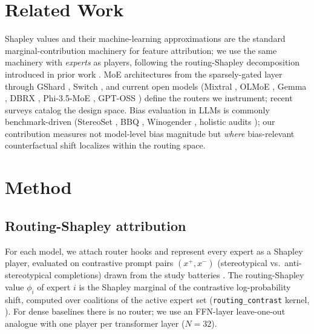 \documentclass[sigconf]{acmart}
\begin{document}

\section{Related Work}
\label{sec:related}
Shapley values \cite{shapley1953} and their machine-learning
approximations \cite{lundberg2017,rozemberczki2022} are the standard
marginal-contribution machinery for feature attribution; we use the same
machinery with \emph{experts} as players, following the routing-Shapley
decomposition introduced in prior work \cite{moe_research_2026}. MoE
architectures from the sparsely-gated layer \cite{shazeer2017} through
GShard \cite{lepikhin2021}, Switch \cite{fedus2022}, and current open
models (Mixtral \cite{jiang2024}, OLMoE \cite{muennighoff2024}, Gemma
\cite{gemmaTeam2024}, DBRX \cite{databricks2024dbrx}, Phi-3.5-MoE
\cite{abdin2024phi3}, GPT-OSS \cite{openai2025gptoss}) define the routers
we instrument; recent surveys \cite{cai2024} catalog the design space.
Bias evaluation in LLMs is commonly benchmark-driven (StereoSet
\cite{nadeem2021}, BBQ \cite{parrish2022}, Winogender
\cite{rudinger2018winogender}, holistic audits
\cite{liang2023,mehrabi2021}); our
contribution measures not model-level bias magnitude but \emph{where}
bias-relevant counterfactual shift localizes within the routing space.

\section{Method}
\subsection{Routing-Shapley attribution}
For each model, we attach router hooks and represent every expert as a
Shapley player, evaluated on contrastive prompt pairs $(x^+, x^-)$
(stereotypical vs.\ anti-stereotypical completions) drawn from the study
batteries \cite{moe_research_2026}. The routing-Shapley value $\phi_i$ of expert $i$
is the Shapley marginal of the contrastive log-probability shift, computed
over coalitions of the active expert set (\texttt{routing\_contrast} kernel,
). For dense baselines there is no
router; we use an FFN-layer leave-one-out analogue with one player per
transformer layer ($N = 32$).
\end{document}
